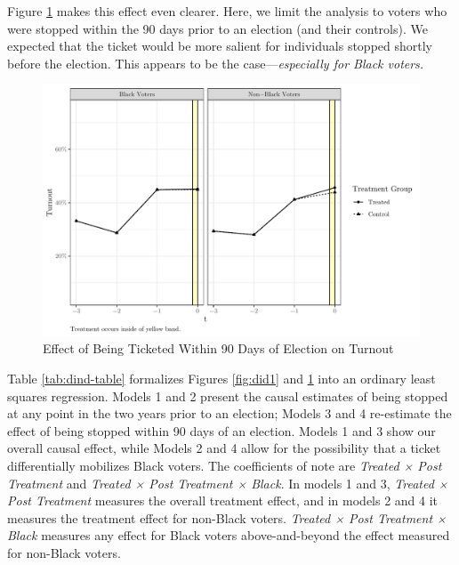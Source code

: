 \documentclass[
  12pt,
]{article}
\begin{document}
Figure \ref{fig:did2} makes this effect even clearer. Here, we limit the analysis to voters who were stopped within the 90 days prior to an election (and their controls). We expected that the ticket would be more salient for individuals stopped shortly before the election. This appears to be the case---\emph{especially for Black voters.}

\begin{figure}[H]

{\centering \includegraphics{draft_paper_files/figure-latex/did2-1} 

}

\caption{\label{fig:did-2}Effect of Being Ticketed Within 90 Days of Election on Turnout}\label{fig:did2}
\end{figure}

Table \ref{tab:dind-table} formalizes Figures \ref{fig:did1} and \ref{fig:did2} into an ordinary least squares regression. Models 1 and 2 present the causal estimates of being stopped at any point in the two years prior to an election; Models 3 and 4 re-estimate the effect of being stopped within 90 days of an election. Models 1 and 3 show our overall causal effect, while Models 2 and 4 allow for the possibility that a ticket differentially mobilizes Black voters. The coefficients of note are \emph{Treated × Post Treatment} and \emph{Treated × Post Treatment × Black}. In models 1 and 3, \emph{Treated × Post Treatment} measures the overall treatment effect, and in models 2 and 4 it measures the treatment effect for non-Black voters. \emph{Treated × Post Treatment × Black} measures any effect for Black voters above-and-beyond the effect measured for non-Black voters.

\begin{singlespace}

\end{singlespace}
\end{document}
